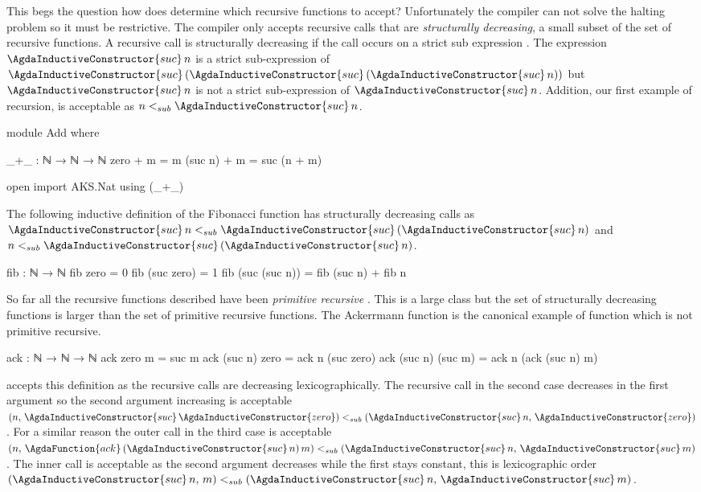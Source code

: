 \documentclass[./Thesis.tex]{subfiles}
\begin{document}
This begs the question how does \Agda{} determine which recursive functions to
accept? Unfortunately the \Agda{} compiler can not solve the halting problem so
it must be restrictive. The compiler only accepts recursive
calls that are \textit{structurally decreasing}, a small
subset of the set of recursive functions. A recursive call is structurally
decreasing if the call occurs on a strict sub expression \cite{agda}. The
expression $\AgdaInductiveConstructor{suc} \, n$ is a strict sub-expression of
$\AgdaInductiveConstructor{suc} \,
  (\AgdaInductiveConstructor{suc} \,
    (\AgdaInductiveConstructor{suc} \, n))
$
but $\AgdaInductiveConstructor{suc} \, n$ is not a strict sub-expression of
$\AgdaInductiveConstructor{suc} \, n$.
Addition, our first example of recursion, is acceptable as
$n <_{sub} \AgdaInductiveConstructor{suc} \, n$.
\begin{code}[hide]
  module Add where
\end{code}
\begin{code}
    _+_ : ℕ → ℕ → ℕ
    zero + m = m
    (suc n) + m = suc (n + m)
\end{code}
\begin{code}[hide]
  open import AKS.Nat using (_+_)
\end{code}
The following inductive definition of the Fibonacci function
has structurally decreasing calls as
$\AgdaInductiveConstructor{suc} \, n <_{sub} \AgdaInductiveConstructor{suc} \, (\AgdaInductiveConstructor{suc} \, n)$
and
$n <_{sub} \AgdaInductiveConstructor{suc} \, (\AgdaInductiveConstructor{suc} \, n)$.
\begin{code}
  fib : ℕ → ℕ
  fib zero = 0
  fib (suc zero) = 1
  fib (suc (suc n)) = fib (suc n) + fib n
\end{code}
So far all the recursive functions described have been
\textit{primitive recursive} \cite{soare}. This is a large class but the set of
structurally decreasing functions is larger than the set of primitive
recursive functions. The Ackerrmann function is the canonical example of
function which is not primitive recursive.
\begin{code}
  ack : ℕ → ℕ → ℕ
  ack zero m = suc m
  ack (suc n) zero = ack n (suc zero)
  ack (suc n) (suc m) = ack n (ack (suc n) m)
\end{code}
\Agda{} accepts this definition as the recursive
calls are decreasing lexicographically.
The recursive call in the second case decreases in the first argument so
the second argument increasing is acceptable
$
(n, \, \AgdaInductiveConstructor{suc} \, \AgdaInductiveConstructor{zero})
<_{sub}
(\AgdaInductiveConstructor{suc} \, n, \, \AgdaInductiveConstructor{zero})
$.
For a similar reason the outer call in the third case is acceptable
$
(n, \, \AgdaFunction{ack} \, (\AgdaInductiveConstructor{suc} \, n) \, m)
<_{sub}
(\AgdaInductiveConstructor{suc} \, n, \, \AgdaInductiveConstructor{suc} \, m)
$.
The inner call is acceptable as the second argument decreases while the first
stays constant, this is lexicographic order
$
(\AgdaInductiveConstructor{suc} \, n, \, m)
<_{sub}
(\AgdaInductiveConstructor{suc} \, n, \, \AgdaInductiveConstructor{suc} \, m)
$. \\
\end{document}
